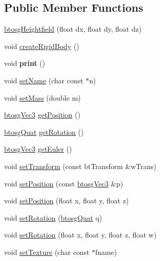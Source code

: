 \subsection*{Public Member Functions}
\begin{DoxyCompactItemize}
\item 
\mbox{\hyperlink{classbtosgHeightfield_a535e1a7b47bb279fdfa0d6d6826251ab}{btosg\+Heightfield}} (float dx, float dy, float dz)
\item 
void \mbox{\hyperlink{classbtosgHeightfield_a9f44ffd7e820af4a3dc4b6cc036bda36}{create\+Rigid\+Body}} ()
\item 
\mbox{\label{classbtosgObject_a4432b5c28097065e89e045a8d02c45e6}} 
void {\bfseries print} ()
\item 
void \mbox{\hyperlink{classbtosgObject_ab06a1b3f357209214c6440cd5746523e}{set\+Name}} (char const $\ast$n)
\item 
void \mbox{\hyperlink{classbtosgObject_a91da93c82d48b86192f0cbb16054fe57}{set\+Mass}} (double m)
\item 
\mbox{\hyperlink{classbtosgVec3}{btosg\+Vec3}} \mbox{\hyperlink{classbtosgObject_a3dadd5da8f2a312e44a039446b93d4cd}{get\+Position}} ()
\item 
\mbox{\hyperlink{classbtosgQuat}{btosg\+Quat}} \mbox{\hyperlink{classbtosgObject_a3b825999ad3a51bde743d4085ff19dae}{get\+Rotation}} ()
\item 
\mbox{\hyperlink{classbtosgVec3}{btosg\+Vec3}} \mbox{\hyperlink{classbtosgObject_a2019ec63bde02b72600450c7c985e77a}{get\+Euler}} ()
\item 
void \mbox{\hyperlink{classbtosgObject_ad33fcab26c0c83ccab6dca6906e8cdb0}{set\+Transform}} (const bt\+Transform \&w\+Trans)
\item 
void \mbox{\hyperlink{classbtosgObject_ace6b51040b7ddce90818174200cc6074}{set\+Position}} (const \mbox{\hyperlink{classbtosgVec3}{btosg\+Vec3}} \&p)
\item 
void \mbox{\hyperlink{classbtosgObject_adb9f2cff0faf66dc252cd7c97b11ac84}{set\+Position}} (float x, float y, float z)
\item 
void \mbox{\hyperlink{classbtosgObject_a6365748d5506bb9da31907c9988071fa}{set\+Rotation}} (\mbox{\hyperlink{classbtosgQuat}{btosg\+Quat}} q)
\item 
void \mbox{\hyperlink{classbtosgObject_a4d21ca59b944fd26644db35d3e9ba67a}{set\+Rotation}} (float x, float y, float z, float w)
\item 
void \mbox{\hyperlink{classbtosgObject_aff54acbc7c66811efb0cf2838107a241}{set\+Texture}} (char const $\ast$fname)

\end{DoxyCompactItemize}
